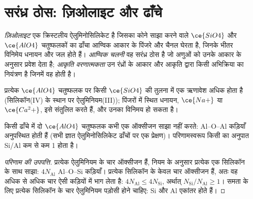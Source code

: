 \section{सरंध्र ठोस: ज़िओलाइट और ढाँचे}

\begin{definition}[ज़िओलाइट]\label{def:b3:inorganic-materials:zeolite}
\emph{ज़िओलाइट} एक क्रिस्टलीय ऐलुमिनोसिलिकेट है जिसका
कोने साझा करने वाले $\ce{SiO4}$ और $\ce{AlO4}$ चतुष्फलकों का ढाँचा आण्विक आकार के पिंजरे और
चैनल घेरता है, जिनके भीतर विनिमेय धनायन और जल होते हैं।
\emph{आण्विक चलनी} वह सरंध्र ठोस है जो
अणुओं को उनके आकार के अनुसार प्रवेश देता है; \emph{आकृति वरणात्मकता}
उन रंध्रों के आकार और आकृति द्वारा किसी अभिक्रिया का नियंत्रण है जिनमें
वह होती है।
\end{definition}

प्रत्येक $\ce{AlO4}$ चतुष्फलक पर किसी $\ce{SiO4}$ की तुलना में एक ऋणावेश अधिक होता है
(सिलिकॉन(IV) के स्थान पर ऐलुमिनियम(III)); पिंजरों में स्थित धनायन, $\ce{Na+}$ या $\ce{Ca^2+}$,
इसे संतुलित करते हैं, और उनका विनिमय हो सकता है।

\begin{proposition}[लोवेनस्टाइन का नियम]\label{prop:b3:inorganic-materials:lowenstein}
किसी  ढाँचे में दो $\ce{AlO4}$ चतुष्फलक कभी एक ऑक्सीजन साझा नहीं करते: Al--O--Al कड़ियाँ
अनुपस्थित होती हैं (सभी ज्ञात ऐलुमिनोसिलिकेट ढाँचों पर एक प्रेक्षण)। परिणामस्वरूप
किसी  का अनुपात Si/Al कम से कम 1 होता है।
\end{proposition}

\begin{proof}[परिणाम की उपपत्ति]
प्रत्येक ऐलुमिनियम के चार ऑक्सीजन हैं, नियम के अनुसार प्रत्येक एक सिलिकॉन के साथ साझा:
$4N_{\mathrm{Al}}$ Al--O--Si कड़ियाँ। प्रत्येक सिलिकॉन के केवल चार ऑक्सीजन हैं, अतः वह अधिक से अधिक
चार ऐसी कड़ियों में भाग लेता है: $4N_{\mathrm{Al}} \le 4N_{\mathrm{Si}}$, अर्थात् $N_{\mathrm{Si}}/N_{\mathrm{Al}} \ge 1$। समता के लिए प्रत्येक
सिलिकॉन के चार ऐलुमिनियम पड़ोसी होने चाहिए: Si और Al एकांतर होते हैं।
\end{proof}

